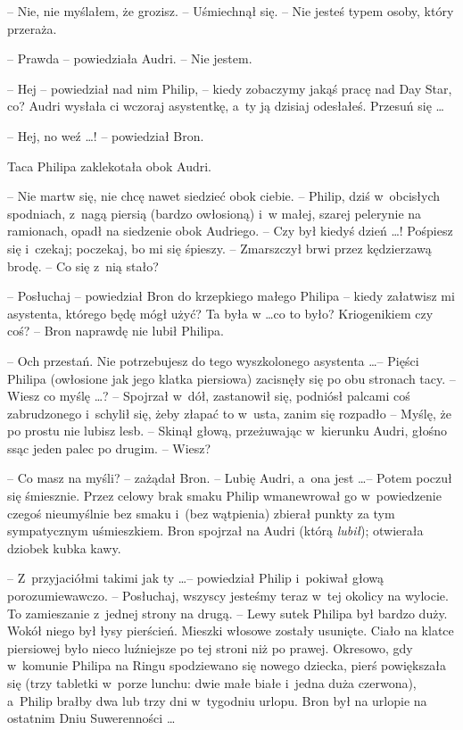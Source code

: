 \documentclass[oneside,polish,11pt,rmheadings]{mwbk}
\begin{document}
-- Nie, nie myślałem, że grozisz. -- Uśmiechnął się.  -- Nie jesteś typem osoby, który przeraża. 

-- Prawda -- powiedziała Audri. -- Nie jestem. 

-- Hej -- powiedział nad nim Philip, -- kiedy zobaczymy jakąś pracę nad Day Star, co? Audri wysłała ci wczoraj asystentkę, a~ty ją dzisiaj odesłałeś. Przesuń się \ldots  

-- Hej, no weź \ldots ! -- powiedział Bron. 

Taca Philipa zaklekotała obok Audri.  

-- Nie martw się, nie chcę nawet siedzieć obok ciebie. -- Philip, dziś w~obcisłych spodniach, z~nagą piersią (bardzo owłosioną) i~w małej, szarej pelerynie na ramionach, opadł na siedzenie obok Audriego. -- Czy był kiedyś dzień \ldots ! Pośpiesz się i~czekaj; poczekaj, bo mi się śpieszy. -- Zmarszczył brwi przez kędzierzawą brodę. -- Co się z~nią stało? 

-- Posłuchaj -- powiedział Bron do krzepkiego małego Philipa -- kiedy załatwisz mi asystenta, którego będę mógł użyć? Ta była w \ldots  co to było? Kriogenikiem czy coś? -- Bron naprawdę nie lubił Philipa. 

-- Och przestań. Nie potrzebujesz do tego wyszkolonego asystenta \ldots  -- Pięści Philipa (owłosione jak jego klatka piersiowa) zacisnęły się po obu stronach tacy.  -- Wiesz co myślę \ldots ? -- Spojrzał w~dół, zastanowił się, podniósł palcami coś zabrudzonego i~schylił się, żeby złapać to w~usta, zanim się rozpadło -- Myślę, że po prostu nie lubisz lesb. -- Skinął głową, przeżuwając w~kierunku Audri, głośno ssąc jeden palec po drugim. -- Wiesz? 

-- Co masz na myśli? -- zażądał Bron. -- Lubię Audri, a~ona jest \ldots  -- Potem poczuł się śmiesznie. Przez celowy brak smaku Philip wmanewrował go w~powiedzenie czegoś nieumyślnie bez smaku i~(bez wątpienia) zbierał punkty za tym sympatycznym uśmieszkiem. Bron spojrzał na Audri (którą \textit{lubił}); otwierała dziobek kubka kawy. 

-- Z~przyjaciółmi takimi jak ty \ldots  -- powiedział Philip i~pokiwał głową porozumiewawczo. -- Posłuchaj, wszyscy jesteśmy teraz w~tej okolicy na wylocie. To zamieszanie z~jednej strony na drugą. -- Lewy sutek Philipa był bardzo duży. Wokół niego był łysy pierścień. Mieszki włosowe zostały usunięte. Ciało na klatce piersiowej było nieco luźniejsze po tej stroni niż po prawej. Okresowo, gdy w~komunie Philipa na Ringu spodziewano się nowego dziecka, pierś powiększała się (trzy tabletki w~porze lunchu: dwie małe białe i~jedna duża czerwona), a~Philip brałby dwa lub trzy dni w~tygodniu urlopu. Bron był na urlopie na ostatnim Dniu Suwerenności \ldots  
\end{document}
